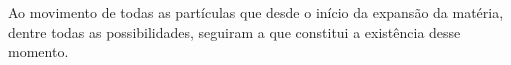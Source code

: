 Ao movimento de todas as partículas que desde o início da expansão da matéria, dentre todas as possibilidades, seguiram a que constitui a existência desse momento.